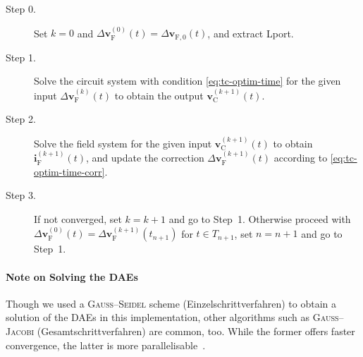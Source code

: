 \begin{description}
  \item[Step 0.] Set $k = 0$ and $\Delta \mathbf{v}_{\text{F}}^{(0)}(t) = \Delta \mathbf{v}_{\text{F},0}(t)$,
    and extract \gls{Lport}.
  \item[Step 1.] Solve the circuit system with condition \eqref{eq:tc-optim-time}
    for the given input $\Delta \mathbf{v}_{\text{F}}^{(k)}(t)$ to obtain the output
    $\mathbf{v}_{\text{C}}^{(k+1)}(t)$.
  \item[Step 2.] Solve the field system for the given input
     $\mathbf{v}_{\text{C}}^{(k+1)}(t)$ to obtain $\mathbf{i}_{\text{F}}^{(k+1)}(t)$, and update the correction
    $\Delta \mathbf{v}_{\text{F}}^{(k+1)}(t)$ according to \eqref{eq:tc-optim-time-corr}.
  \item[Step 3.] If not converged, set $k = k+1$ and go to Step~1.       
    Otherwise proceed with
    $\Delta \mathbf{v}_{\text{F}}^{(0)}(t) = \Delta \mathbf{v}_{\text{F}}^{(k+1)}(t_{n+1})$
    for $t \in T_{n+1}$, set $n = n+1$ and go to Step~1.
\end{description}

\paragraph{Note on Solving the DAEs} Though we used a \textsc{Gauss--Seidel} scheme (Einzelschrittverfahren) to obtain a solution of the DAEs in this implementation, other algorithms such as \textsc{Gauss--Jacobi} (Gesamtschrittverfahren) are common, too. While the former offers faster convergence, the latter is more parallelisable~\cite{Bartel2013}.
